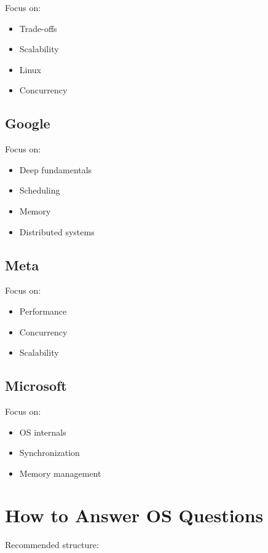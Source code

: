 Focus on:

\begin{itemize}
\item Trade-offs
\item Scalability
\item Linux
\item Concurrency
\end{itemize}

\subsection*{Google}

Focus on:

\begin{itemize}
\item Deep fundamentals
\item Scheduling
\item Memory
\item Distributed systems
\end{itemize}

\subsection*{Meta}

Focus on:

\begin{itemize}
\item Performance
\item Concurrency
\item Scalability
\end{itemize}

\subsection*{Microsoft}

Focus on:

\begin{itemize}
\item OS internals
\item Synchronization
\item Memory management
\end{itemize}

\section{How to Answer OS Questions}

Recommended structure:

